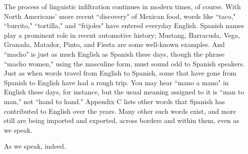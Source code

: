 The process of linguistic infiltration continues in modern
times, of course. With North Americans' more recent ``discovery" of
Mexican food, words like ``taco," ``burrito," ``tortilla," and ``frijoles"
have entered everyday English. Spanish names play a prominent role in
recent automotive history; Mustang, Barracuda, Vega, Granada, Matador, Pinto, and Fiesta are some well-known examples. And ``macho" is
just as much English as Spanish these days, though the phrase ``macho
women," using the masculine form, must sound odd to Spanish speakers. Just as when words travel from English to Spanish, some that have
gone from Spanish to English have had a rough trip. You may hear ``mano
a mano" in English these days, for instance, but the usual meaning assigned to it is ``man to man," not ``hand to hand." Appendix C lists
other words that Spanish has contributed to English over the years.
Many other such words exist, and more still are being imported and
exported, across borders and within them, even as we speak.

As we speak, indeed.


